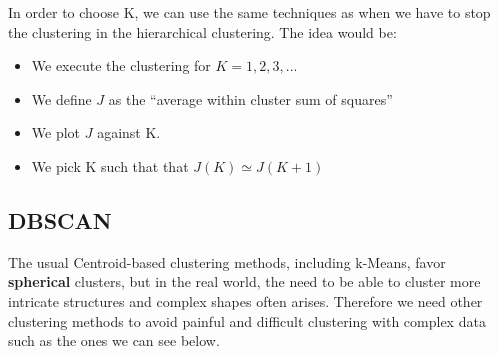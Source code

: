 In order to choose K, we can use the same techniques as when we have to stop the clustering in the hierarchical clustering. The idea would be:
\begin{itemize}
 \item We execute the clustering for $K=1,2,3,...$
 \item We define $J$ as the ``average within cluster sum of squares''
 \item We plot $J$ against K.
 \item We pick K such that that $J(K) \simeq J(K+1)$
\end{itemize}


\subsection{DBSCAN}

The usual Centroid-based clustering methods, including k-Means, favor \textbf{spherical} clusters, but in the real world, the need to be able to cluster more intricate structures and complex shapes often arises. Therefore we need other clustering methods to avoid painful and difficult clustering with complex data such as the ones we can see below.

